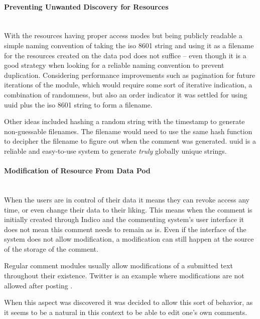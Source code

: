 \paragraph{Preventing Unwanted Discovery for Resources}\mbox{}\\

With the resources having proper access modes but being publicly readable a simple naming convention of taking the \gls{iso} 8601 string and using it as a filename for the resources created on the data pod does not suffice -- even though it is a good strategy when looking for a reliable naming convention to prevent duplication. Considering performance improvements such as pagination for future iterations of the module, which would require some sort of iterative indication, a combination of randomness, but also an order indicator it was settled for using \gls{uuid} plus the \gls{iso} 8601 string to form a filename.

Other ideas included hashing a random string with the timestamp to generate non-guessable filenames. The filename would need to use the same hash function to decipher the filename to figure out when the comment was generated. \gls{uuid} is a reliable and easy-to-use system to generate \textit{truly} globally unique strings. 
\vspace{0.5cm}
\paragraph{Modification of Resource From Data Pod}\mbox{}\\

When the users are in control of their data it means they can revoke access any time, or even change their data to their liking. This means when the comment is initially created through Indico and the commenting system's user interface it does not mean this comment needs to remain as is. Even if the interface of the system does not allow modification, a modification can still happen at the source of the storage of the comment.

Regular comment modules usually allow modifications of a submitted text throughout their existence. Twitter is an example where modifications are not allowed after posting \cite{twitter-edit}. 

When this aspect was discovered it was decided to allow this sort of behavior, as it seems to be a natural in this context to be able to edit one's own comments.

\vspace{0.5cm}
